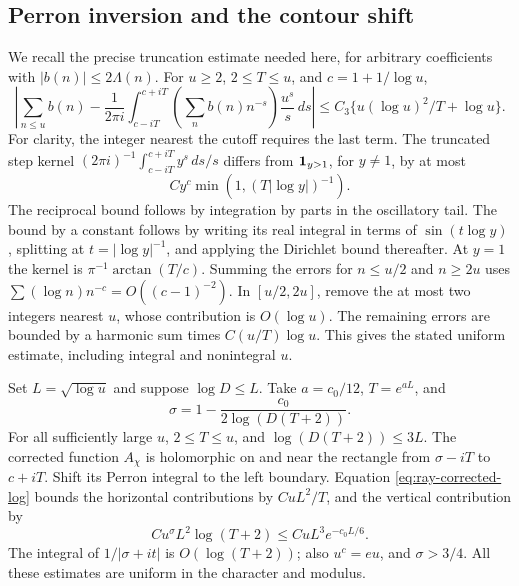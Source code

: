 \subsection{Perron inversion and the contour shift}

We recall the precise truncation estimate needed here, for arbitrary
coefficients with \(|b(n)|\leq2\Lambda(n)\).
For \(u\geq2\), \(2\leq T\leq u\), and \(c=1+1/\log u\),
\[
 \left|\sum_{n\leq u}b(n)
     -\frac1{2\pi i}\int_{c-iT}^{c+iT}
            \left(\sum_nb(n)n^{-s}\right)\frac{u^s}{s}\,ds\right|
                    \leq C_3\{u(\log u)^2/T+\log u\}.
\]
For clarity, the integer nearest the cutoff requires the last term.
The truncated step kernel
\((2\pi i)^{-1}\int_{c-iT}^{c+iT}y^s\,ds/s\) differs from
\({\bf1}_{y>1}\), for \(y\ne1\), by at most
\[
                  C y^c\min(1,(T|\log y|)^{-1}).
\]
The reciprocal bound follows by integration by parts in the
oscillatory tail. The bound by a constant follows by writing its
real integral in terms of \(\sin(t\log y)\), splitting at
\(t=|\log y|^{-1}\), and applying the Dirichlet bound thereafter.
At \(y=1\) the kernel is \(\pi^{-1}\arctan(T/c)\).
Summing the errors for \(n\leq u/2\) and \(n\geq2u\) uses
\(\sum(\log n)n^{-c}=O((c-1)^{-2})\).
In \([u/2,2u]\), remove the at most two integers nearest \(u\),
whose contribution is \(O(\log u)\).
The remaining errors are bounded by a harmonic sum times
\(C(u/T)\log u\). This gives the stated uniform estimate,
including integral and nonintegral \(u\).

Set \(L=\sqrt{\log u}\) and suppose \(\log D\leq L\).
Take \(a=c_0/12\), \(T=e^{aL}\), and
\[
                  \sigma=1-\frac{c_0}{2\log(D(T+2))}.
\]
For all sufficiently large \(u\), \(2\leq T\leq u\), and
\(\log(D(T+2))\leq3L\).
The corrected function \(A_\chi\) is holomorphic on and near the
rectangle from \(\sigma-iT\) to \(c+iT\).
Shift its Perron integral to the left boundary. Equation
\eqref{eq:ray-corrected-log} bounds the horizontal contributions
by \(C uL^2/T\), and the vertical contribution by
\[
                C u^\sigma L^2\log(T+2)
                         \leq C uL^3e^{-c_0L/6}.
\]
The integral of \(1/|\sigma+it|\) is \(O(\log(T+2))\);
also \(u^c=eu\), and \(\sigma>3/4\).
All these estimates are uniform in the character and modulus.

